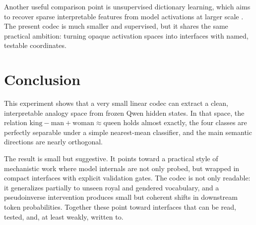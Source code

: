 \documentclass[11pt]{article}
\begin{document}
Another useful comparison point is unsupervised dictionary learning, which aims
to recover sparse interpretable features from model activations at larger scale
\cite{templeton2024}. The present codec is much smaller and supervised, but it
shares the same practical ambition: turning opaque activation spaces into
interfaces with named, testable coordinates.

\section{Conclusion}

This experiment shows that a very small linear codec can extract a clean,
interpretable analogy space from frozen Qwen hidden states. In that space, the
relation \(\mathrm{king} - \mathrm{man} + \mathrm{woman} \approx
\mathrm{queen}\) holds almost exactly, the four classes are perfectly separable
under a simple nearest-mean classifier, and the main semantic directions are
nearly orthogonal.

The result is small but suggestive. It points toward a practical style of
mechanistic work where model internals are not only probed, but wrapped in
compact interfaces with explicit validation gates. The codec is not only
readable: it generalizes partially to unseen royal and gendered vocabulary, and
a pseudoinverse intervention produces small but coherent shifts in downstream
token probabilities. Together these point toward interfaces that can be read,
tested, and, at least weakly, written to.
\end{document}
